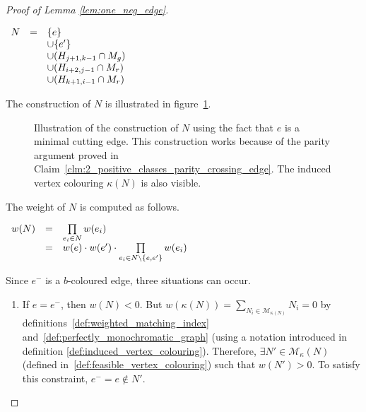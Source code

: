 \begin{proof}[Proof of Lemma \ref{lem:one_neg_edge}]
\begin{enumerate}
        \begin{center}
            $\begin{array}{r c l}
                N & = & \{e\}                             \\
                  &   & \cup \{e'\}                       \\
                  &   & \cup (H_{j+1, k-1} \cap M_g)      \\
                  &   & \cup (H_{i + 2, j - 1} \cap M_r)  \\
                  &   & \cup (H_{k+1, i-1} \cap M_r)
            \end{array}$
        \end{center}

        The construction of $N$ is illustrated in figure~\ref{fig:one-neg-edge}.

        \begin{figure}[H]
            \caption{Illustration of the construction of $N$ using the fact that $e$ is a minimal cutting edge.
                This construction works because of the parity argument proved in Claim~\ref{clm:2_positive_classes_parity_crossing_edge}.
                The induced vertex colouring $\kappa(N)$ is also visible.}
            \label{fig:one-neg-edge}
        \end{figure}

        The weight of $N$ is computed as follows.
        \begin{center}
            $\begin{array}{r c l}
            w(N) & = & \prod\limits_{e_i \in N} w(e_i) \\
                 & = & w(e) \cdot w(e') \cdot \prod\limits_{e_i \in N \setminus \{e, e'\}} w(e_i) \\
            \end{array}$
        \end{center}

        Since $e^-$ is a $b$-coloured edge, three situations can occur.
        \begin{enumerate}
            \item If $e = e^-$, then $w(N) < 0$.
                But $w(\kappa(N)) = \sum\limits_{N_i \in \mathcal{M}_{\kappa(N)}} N_i = 0$ by definitions~\ref{def:weighted_matching_index} and~\ref{def:perfectly_monochromatic_graph} (using a notation introduced in definition \ref{def:induced_vertex_colouring}).
                Therefore, $\exists N' \in \mathcal{M}_\kappa(N)$ (defined in~\ref{def:feasible_vertex_colouring}) such that $w(N') > 0$.
                To satisfy this constraint, $e^- = e \notin N'$.\\


\end{enumerate}
\end{enumerate}
\end{proof}

